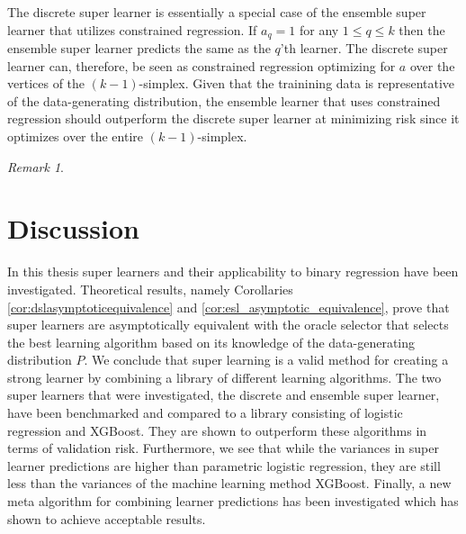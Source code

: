 \documentclass[11pt, a4paper]{article}
\theoremstyle{definition}
\theoremstyle{remark}
\newtheorem*{remark}{Remark}
\newcommand{\q}{q}
\newcommand{\ml}{k}
\begin{document}
The discrete super learner is essentially a special case of the ensemble super learner that utilizes constrained regression. If $ a_\q = 1 $ for any $ 1 \leq \q \leq k $ then the ensemble super learner predicts the same as the $ \q $'th learner. The discrete super learner can, therefore, be seen as constrained regression optimizing for $ a $ over the vertices of the $ (\ml -1) $-simplex. Given that the trainining data is representative of the data-generating distribution, the ensemble learner that uses constrained regression should outperform the discrete super learner at minimizing risk since it optimizes over the entire $ (\ml -1) $-simplex.  

\begin{remark}
\end{remark}


\section{Discussion}
In this thesis super learners and their applicability to binary regression have been investigated. Theoretical results, namely Corollaries \ref{cor:dslasymptoticequivalence} and \ref{cor:esl_asymptotic_equivalence}, prove that super learners are asymptotically equivalent with the oracle selector that selects the best learning algorithm based on its knowledge of the data-generating distribution $ P $. We conclude that super learning is a valid method for creating a strong learner by combining a library of different learning algorithms. The two super learners that were investigated,  the discrete and ensemble super learner, have been benchmarked and compared to a library consisting of logistic regression and XGBoost. They are shown to outperform these algorithms in terms of validation risk. Furthermore, we see that while the variances in super learner predictions are higher than parametric logistic regression, they are still less than the variances of the machine learning method XGBoost. Finally, a new meta algorithm for combining learner predictions has been investigated which has shown to achieve acceptable results.  
\end{document}
